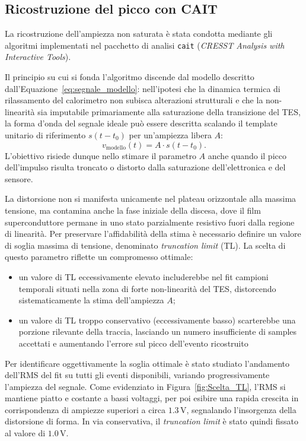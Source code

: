 \subsection{Ricostruzione del picco con CAIT}
\label{subsec:Ricostruzione_picco}

La ricostruzione dell'ampiezza non saturata è stata condotta mediante gli algoritmi implementati nel pacchetto di analisi \texttt{cait} (\textit{CRESST Analysis with Interactive Tools}). 

Il principio su cui si fonda l'algoritmo discende dal modello descritto dall'Equazione~\eqref{eq:segnale_modello}: nell'ipotesi che la dinamica termica di rilassamento del calorimetro non subisca alterazioni strutturali e che la non-linearità sia imputabile primariamente alla saturazione della transizione del TES, la forma d'onda del segnale ideale può essere descritta scalando il template unitario di riferimento $s(t - t_0)$ per un'ampiezza libera $A$:
\begin{equation}
    v_{\text{modello}}(t) = A \cdot s(t - t_0).
\end{equation}
L'obiettivo risiede dunque nello stimare il parametro $A$ anche quando il picco dell'impulso risulta troncato o distorto dalla saturazione dell'elettronica e del sensore.

La distorsione non si manifesta unicamente nel plateau orizzontale alla massima tensione, ma contamina anche la fase iniziale della discesa, dove il film superconduttore permane in uno stato parzialmente resistivo fuori dalla regione di linearità. Per preservare l'affidabilità della stima è necessario definire un valore di soglia massima di tensione, denominato \textit{truncation limit} (TL). La scelta di questo parametro riflette un compromesso ottimale:
\begin{itemize}
    \item un valore di TL eccessivamente elevato includerebbe nel fit campioni temporali situati nella zona di forte non-linearità del TES, distorcendo sistematicamente la stima dell'ampiezza $A$;
    \item un valore di TL troppo conservativo (eccessivamente basso) scarterebbe una porzione rilevante della traccia, lasciando un numero insufficiente di samples accettati e aumentando l'errore sul picco dell'evento ricostruito
\end{itemize}

Per identificare oggettivamente la soglia ottimale è stato studiato l'andamento dell'RMS del fit su tutti gli eventi disponibili, variando progressivamente l'ampiezza del segnale. Come evidenziato in Figura~\ref{fig:Scelta_TL}, l'RMS si mantiene piatto e costante a bassi voltaggi, per poi esibire una rapida crescita in corrispondenza di ampiezze superiori a circa $1.3\,\text{V}$, segnalando l'insorgenza della distorsione di forma. In via conservativa, il \textit{truncation limit} è stato quindi fissato al valore di $1.0\,\text{V}$.

